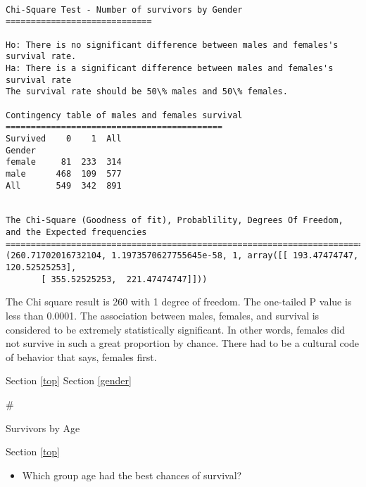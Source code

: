 \documentclass[11pt]{article}
\providecommand{\tightlist}{%
      \setlength{\itemsep}{0pt}\setlength{\parskip}{0pt}}
\begin{document}
    \begin{Verbatim}[commandchars=\\\{\}]

Chi-Square Test - Number of survivors by Gender
=============================

Ho: There is no significant difference between males and females's survival rate.
Ha: There is a significant difference between males and females's survival rate
The survival rate should be 50\% males and 50\% females.

Contingency table of males and females survival
===========================================
Survived    0    1  All
Gender                 
female     81  233  314
male      468  109  577
All       549  342  891


The Chi-Square (Goodness of fit), Probablility, Degrees Of Freedom, and the Expected frequencies
==============================================================================
(260.71702016732104, 1.1973570627755645e-58, 1, array([[ 193.47474747,  120.52525253],
       [ 355.52525253,  221.47474747]]))

    \end{Verbatim}

    The Chi square result is 260 with 1 degree of freedom. The one-tailed P
value is less than 0.0001. The association between males, females, and
survival is considered to be extremely statistically significant. In
other words, females did not survive in such a great proportion by
chance. There had to be a cultural code of behavior that says, females
first.

    Section \ref{top} Section \ref{gender}

     \#

Survivors by Age

Section \ref{top}

    \begin{itemize}
\tightlist
\item
  Which group age had the best chances of survival?
\end{itemize}
\end{document}
